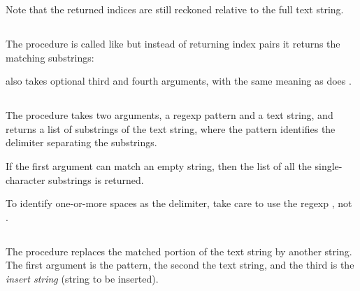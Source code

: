 {\n Note that the returned indices are still reckoned
relative to the full text string.

\subsection{}

The procedure  is called
like 
but instead of returning index pairs it returns the
matching substrings:


\n {} also takes optional third and
fourth arguments, with the same meaning as does
.

\subsection{}

The procedure  takes
two arguments, a
regexp pattern and a text string, and returns a list of
substrings of the text string, where the pattern identifies the
delimiter separating the substrings.


\n If the first argument can match an empty string, then
the list of all the single-character substrings is returned.


\n To identify one-or-more spaces as the delimiter,
take care to use the regexp , not .


\subsection{}

The procedure  replaces
the
matched portion of the text string by another
string.  The first argument is the pattern,
the second the text string, and the third
is the {\em insert string} (string to be inserted).

}

